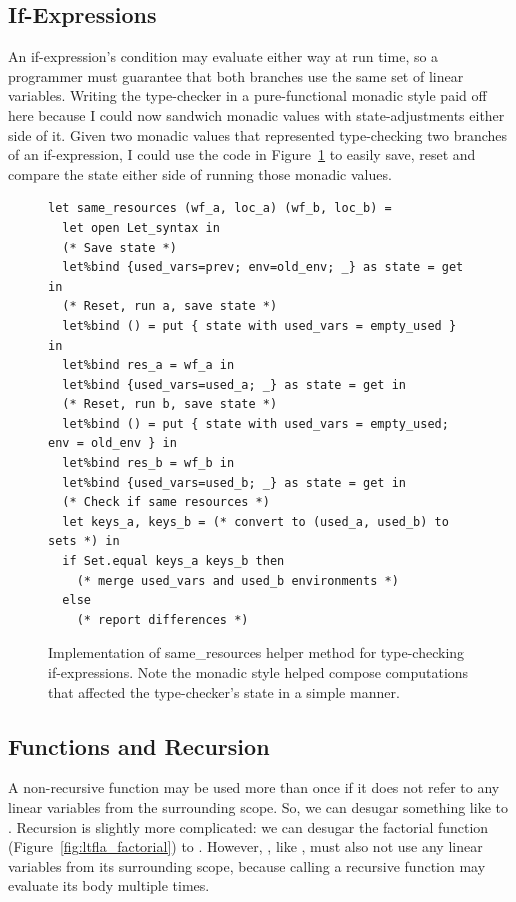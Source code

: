 \subsection{If-Expressions}

An if-expression's condition may evaluate either way at run time, so a
programmer must guarantee that both branches use the same set of linear
variables. Writing the type-checker in a pure-functional monadic style paid off
here because I could now sandwich monadic values with state-adjustments either
side of it. Given two monadic values that represented type-checking two
branches of an if-expression, I could use the code in
Figure~\ref{fig:same_resources} to easily save, reset and compare the state
either side of running those monadic values.

\begin{figure}[tp]
    \begin{verbatim}
let same_resources (wf_a, loc_a) (wf_b, loc_b) =
  let open Let_syntax in
  (* Save state *)
  let%bind {used_vars=prev; env=old_env; _} as state = get in
  (* Reset, run a, save state *)
  let%bind () = put { state with used_vars = empty_used } in
  let%bind res_a = wf_a in
  let%bind {used_vars=used_a; _} as state = get in
  (* Reset, run b, save state *)
  let%bind () = put { state with used_vars = empty_used; env = old_env } in
  let%bind res_b = wf_b in
  let%bind {used_vars=used_b; _} as state = get in
  (* Check if same resources *)
  let keys_a, keys_b = (* convert to (used_a, used_b) to sets *) in
  if Set.equal keys_a keys_b then
    (* merge used_vars and used_b environments *)
  else
    (* report differences *)
    \end{verbatim}

    \caption{Implementation of same\_resources helper method for type-checking
        if-expressions. Note the monadic style helped compose computations that
        affected the type-checker's state in a simple manner.}\label{fig:same_resources}

\end{figure}

\subsection{Functions and Recursion}

A non-recursive function may be used more than once if it does not refer to any
linear variables from the surrounding scope. So, we can desugar something like
 to .  Recursion is slightly
more complicated: we can desugar the factorial function
(Figure~\ref{fig:ltfla_factorial}) to . However, , like , must also
not use any linear variables from its surrounding scope, because calling a
recursive function may evaluate its body multiple times.

